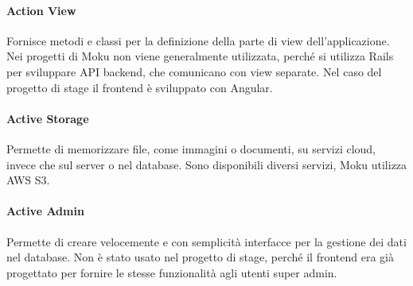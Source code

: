 \paragraph{Action View} Fornisce metodi e classi per la definizione della parte di view dell'applicazione. Nei progetti di Moku non viene generalmente utilizzata, perché si utilizza Rails per sviluppare API backend, che comunicano con view separate. Nel caso del progetto di stage il frontend è sviluppato con Angular.
\paragraph{Active Storage} Permette di memorizzare file, come immagini o documenti, su servizi cloud, invece che sul server o nel database. Sono disponibili diversi servizi, Moku utilizza AWS S3.
\paragraph{Active Admin} Permette di creare velocemente e con semplicità interfacce per la gestione dei dati nel database. Non è stato usato nel progetto di stage, perché il frontend era già progettato per fornire le stesse funzionalità agli utenti super admin.
